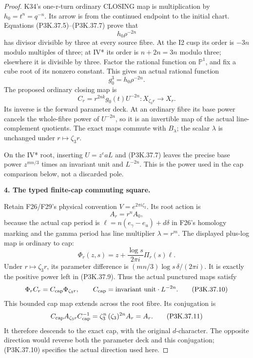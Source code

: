 \begin{proof}
K34's one-r-turn ordinary CLOSING map is multiplication by
\(h_0=t^n=q^{-n}\). Its arrow is from the continued endpoint to the
initial chart. Equations (P3K.37.5)--(P3K.37.7) prove that
\[
                    h_0\rho^{-2n}
\]
has divisor divisible by three at every source fibre. At the I2 cusp its
order is \(-3n\) modulo multiples of three; at IV* its order is
\(n+2n=3n\) modulo three; elsewhere it is divisible by three.
Factor the rational function on \(\mathbb P^1\), and fix a cube root
of its nonzero constant. This gives an actual rational function
\[
                    g_0^3=h_0\rho^{-2n}.                         \tag{P3K.37.8}
\]
The proposed ordinary closing map is
\[
 C_r=r^{2nk}g_0(t)U^{-2n}: X_{\zeta_3r}\longrightarrow X_r.
                                                                    \tag{P3K.37.9}
\]
Its inverse is the forward parameter deck. At an ordinary fibre its base
power cancels the whole-fibre power of \(U^{-2n}\), so it is an
invertible map of the actual line-complement quotients. The exact maps
commute with \(B_\lambda\); the scalar \(\lambda\) is unchanged
under \(r\mapsto\zeta_3r\).

On the IV* root, inserting \(U=z^eaL\) and (P3K.37.7) leaves the precise
base power \(z^{mn/3}\) times an invariant unit and \(L^{-2n}\).
This is the power used in the cap comparison below, not a discarded pole.

\par\medskip\noindent\textbf{4. The typed finite-cap commuting square.}\enspace

Retain F26/F29's physical convention \(V=e^{2\pi i\zeta_2}\).
Its root action is
\[
 A_r=r^n A_0,
\]
because the actual cap period is
\(\ell=n(e_\gamma-e_u)+d\delta\) in F26's homology marking and the
gamma period has line multiplier \(\lambda=r^m\).
The displayed plus-log map is ordinary to cap:
\[
 \Phi_r(z,s)=z+\frac{\log s}{2\pi i}\Pi_r(s)\ell.
\]
Under \(r\mapsto\zeta_3r\), its parameter difference is
\((mn/3)\log s\,\delta/(2\pi i)\). It is exactly the positive
power left in (P3K.37.9). Thus the actual punctured maps satisfy
\[
 \Phi_r C_r=C_{\rm cap}\Phi_{\zeta_3r},\qquad
 C_{\rm cap}=\text{invariant unit}\cdot L^{-2n}.                 \tag{P3K.37.10}
\]
This bounded cap map extends across the root fibre. Its conjugation is
\[
 C_{\rm cap} A_{\zeta_3r} C_{\rm cap}^{-1}
   =\zeta_3^n\,(\zeta_3)^{2n} A_r=A_r.                         \tag{P3K.37.11}
\]
It therefore descends to the exact cap, with the original \(d\)-character.
The opposite direction would reverse both the parameter deck and this
conjugation; (P3K.37.10) specifies the actual direction used here.


\end{proof}
